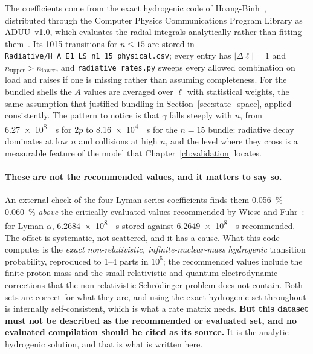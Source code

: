 The coefficients come from the exact hydrogenic code of
Hoang-Binh~\cite{HoangBinh2005}, distributed through the Computer Physics
Communications Program Library as ADUU~v1.0, which evaluates the radial
integrals analytically rather than fitting them~\cite{HoangBinh1990}. Its 1015
transitions for $n \le 15$ are stored in
\texttt{Radiative/H\_A\_E1\_LS\_n1\_15\_physical.csv}; every entry has
$|\Delta\ell| = 1$ and $n_{\text{upper}} > n_{\text{lower}}$, and
\texttt{radiative\_rates.py} sweeps every allowed combination on load and raises
if one is missing rather than assuming completeness. For the bundled shells
the $A$ values are averaged over $\ell$ with statistical weights, the same
assumption that justified bundling in Section~\ref{sec:state_space}, applied
consistently. The pattern to notice is that $\gamma$ falls steeply with $n$,
from \SI{6.27e8}{\per\second} for $2p$ to \SI{8.16e4}{\per\second} for the
$n=15$ bundle: radiative decay dominates at low $n$ and collisions at high $n$,
and the level where they cross is a measurable feature of the model that
Chapter~\ref{ch:validation} locates.

\paragraph{These are not the recommended values, and it matters to say so.}
An external check of the four Lyman-series coefficients finds them
\SIrange{0.056}{0.060}{\percent} \emph{above} the critically evaluated values
recommended by Wiese and Fuhr~\cite{WieseFuhr2009}: for Lyman-$\alpha$,
\SI{6.2684e8}{\per\second} stored against \SI{6.2649e8}{\per\second}
recommended. The offset is systematic, not scattered, and it has a cause. What
this code computes is the \emph{exact non-relativistic, infinite-nuclear-mass
hydrogenic} transition probability, reproduced to 1--4 parts in $10^{5}$; the
recommended values include the finite proton mass and the small relativistic and
quantum-electrodynamic corrections that the non-relativistic Schr\"{o}dinger
problem does not contain. Both sets are correct for what they are, and using the
exact hydrogenic set throughout is internally self-consistent, which is what a
rate matrix needs. \textbf{But this dataset must not be described as the
recommended or evaluated set, and no evaluated compilation should be cited as
its source.} It is the analytic hydrogenic solution, and that is what is written
here.

